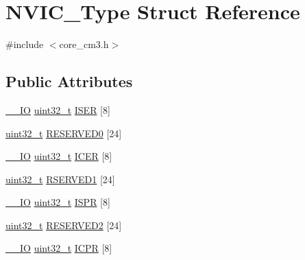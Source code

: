 \hypertarget{struct_n_v_i_c___type}{}\section{N\+V\+I\+C\+\_\+\+Type Struct Reference}
\label{struct_n_v_i_c___type}


{\ttfamily \#include $<$core\+\_\+cm3.\+h$>$}

\subsection*{Public Attributes}
\begin{DoxyCompactItemize}
\item 
\hyperlink{group___c_m_s_i_s___c_m3__core__definitions_gaec43007d9998a0a0e01faede4133d6be}{\+\_\+\+\_\+\+IO} \hyperlink{_p_e___types_8h_a33594304e786b158f3fb30289278f5af}{uint32\+\_\+t} \hyperlink{struct_n_v_i_c___type_a49017ceff4cda919c8058e9b192bfa08}{I\+S\+ER} \mbox{[}8\mbox{]}
\item 
\hyperlink{_p_e___types_8h_a33594304e786b158f3fb30289278f5af}{uint32\+\_\+t} \hyperlink{struct_n_v_i_c___type_abf174b542f11f026eabdc8a74c93ab6e}{R\+E\+S\+E\+R\+V\+E\+D0} \mbox{[}24\mbox{]}
\item 
\hyperlink{group___c_m_s_i_s___c_m3__core__definitions_gaec43007d9998a0a0e01faede4133d6be}{\+\_\+\+\_\+\+IO} \hyperlink{_p_e___types_8h_a33594304e786b158f3fb30289278f5af}{uint32\+\_\+t} \hyperlink{struct_n_v_i_c___type_a2cfb5b93103f658e0521d45bde6f84fd}{I\+C\+ER} \mbox{[}8\mbox{]}
\item 
\hyperlink{_p_e___types_8h_a33594304e786b158f3fb30289278f5af}{uint32\+\_\+t} \hyperlink{struct_n_v_i_c___type_af3ae867e627035f400558623045ee69c}{R\+S\+E\+R\+V\+E\+D1} \mbox{[}24\mbox{]}
\item 
\hyperlink{group___c_m_s_i_s___c_m3__core__definitions_gaec43007d9998a0a0e01faede4133d6be}{\+\_\+\+\_\+\+IO} \hyperlink{_p_e___types_8h_a33594304e786b158f3fb30289278f5af}{uint32\+\_\+t} \hyperlink{struct_n_v_i_c___type_ab7aef74794b43a7df880e19ed50b6257}{I\+S\+PR} \mbox{[}8\mbox{]}
\item 
\hyperlink{_p_e___types_8h_a33594304e786b158f3fb30289278f5af}{uint32\+\_\+t} \hyperlink{struct_n_v_i_c___type_a8e5857c94d765a0855eeec1e6bec1006}{R\+E\+S\+E\+R\+V\+E\+D2} \mbox{[}24\mbox{]}
\item 
\hyperlink{group___c_m_s_i_s___c_m3__core__definitions_gaec43007d9998a0a0e01faede4133d6be}{\+\_\+\+\_\+\+IO} \hyperlink{_p_e___types_8h_a33594304e786b158f3fb30289278f5af}{uint32\+\_\+t} \hyperlink{struct_n_v_i_c___type_a850acda355b0d6a404feb2be9df69b2d}{I\+C\+PR} \mbox{[}8\mbox{]}

\end{DoxyCompactItemize}
